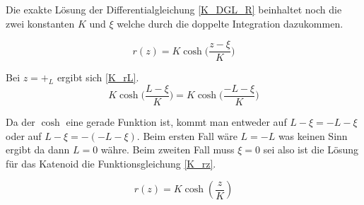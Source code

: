 \begin{refsection}
Die exakte Lösung der Differentialgleichung \eqref{K_DGL_R} beinhaltet noch die zwei konstanten $K$ und $\xi$ welche durch die doppelte Integration dazukommen.

\begin{equation} \label{K_r}
r(z)=K \cosh\bigg(\frac{z-\xi}{K}\bigg)
\end{equation}

Bei $z=+_L$ ergibt sich \eqref{K_rL}.
\begin{equation} \label{K_rL}
K \cosh\bigg(\frac{L-\xi}{K}\bigg)=K \cosh\bigg(\frac{-L-\xi}{K}\bigg)
\end{equation}

Da der $\cosh$ eine gerade Funktion ist, kommt man entweder auf $L-\xi=-L-\xi$ oder auf $L-\xi=-(-L-\xi)$.
Beim ersten Fall wäre $L=-L$ was keinen Sinn ergibt da dann $L=0$ währe. Beim zweiten Fall muss $\xi=0$ sei also ist die Lösung für das Katenoid die Funktionsgleichung \eqref{K_rz}.

\begin{equation} \label{K_rz}
r(z)=K \cosh\left(\frac{z}{K}\right)
\end{equation}





\end{refsection}
